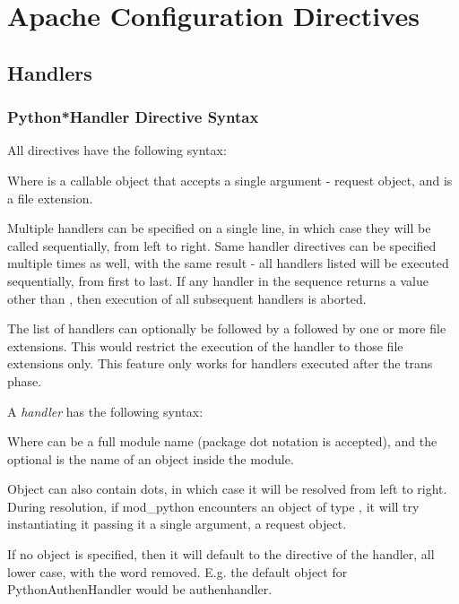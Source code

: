 \chapter{Apache Configuration Directives\label{directives}}

\section{Handlers\label{dir-handlers}}

\subsection{Python*Handler Directive Syntax\label{dir-handlers-syn}}

All  directives have the following syntax: 


Where  is a callable object that accepts a single
argument - request object, and  is a file extension.

Multiple handlers can be specified on a single line, in which case
they will be called sequentially, from left to right. Same handler
directives can be specified multiple times as well, with the same
result - all handlers listed will be executed sequentially, from first
to last. If any handler in the sequence returns a value other than
, then execution of all subsequent handlers is aborted.

The list of handlers can optionally be followed by a \code{|} followed
by one or more file extensions. This would restrict the execution of
the handler to those file extensions only. This feature only works for
handlers executed after the trans phase.

A \emph{handler} has the following syntax: 


Where  can be a full module name (package dot notation is
accepted), and the optional  is the name of an object
inside the module.

Object can also contain dots, in which case it will be resolved from
left to right. During resolution, if mod_python encounters an object
of type , it will try instantiating it passing it a single
argument, a request object.

If no object is specified, then it will default to the directive of
the handler, all lower case, with the word 
removed. E.g. the default object for PythonAuthenHandler would be
authenhandler.

